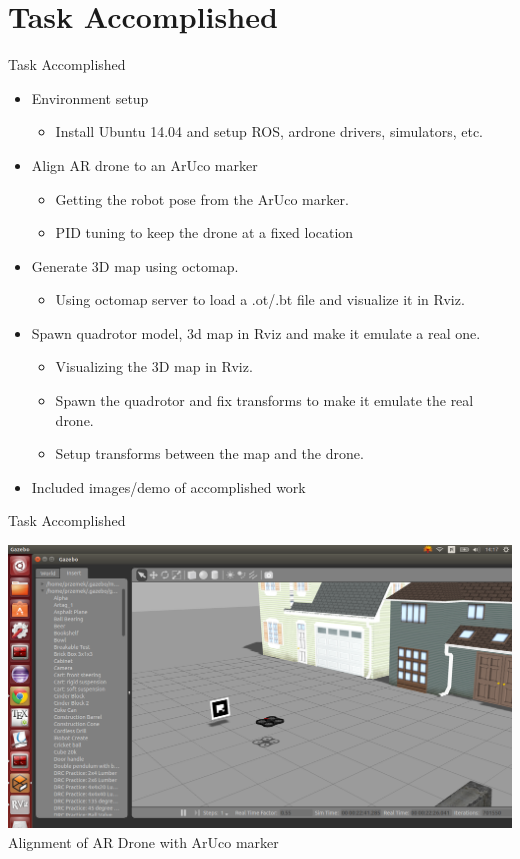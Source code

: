 \documentclass[10pt, a4paper]{beamer}
\begin{document}
\section{Task Accomplished}
\begin{frame}{Task Accomplished}
	\begin{itemize}
		\item Environment setup
        \begin{itemize}
        	\item Install Ubuntu 14.04 and setup ROS, ardrone drivers, simulators, etc.
        \end{itemize}
    	\item Align AR drone to an ArUco marker
        \begin{itemize}
        	\item Getting the robot pose from the ArUco marker.
            \item PID tuning to keep the drone at a fixed location
        \end{itemize}
        \item Generate 3D map using octomap.
        \begin{itemize}
        	\item Using octomap server to load a .ot/.bt file and visualize it in Rviz.
        \end{itemize}
        \item Spawn quadrotor model, 3d map in Rviz and make it emulate a real one.
        \begin{itemize}
        	\item Visualizing the 3D map in Rviz.
            \item Spawn the quadrotor and fix transforms to make it emulate the real drone.
            \item Setup transforms between the map and the drone.
        \end{itemize}
		\item Included images/demo of accomplished work
	\end{itemize}
\end{frame}
\begin{frame}{Task Accomplished}
\begin{center}
\includegraphics[scale=0.2]{aruco_align}\\
		Alignment of AR Drone with ArUco marker
\end{center}
		
\end{frame}
\end{document}

